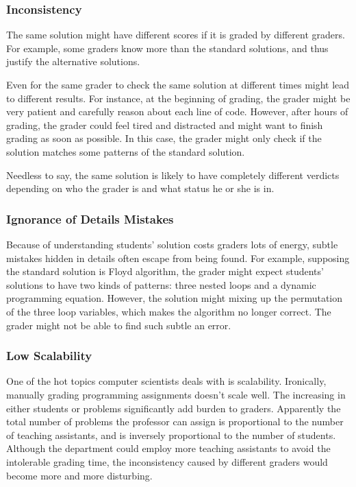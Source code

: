         \subsubsection{Inconsistency}

            The same solution might have different scores if it is graded by different graders.
            For example, some graders know more than the standard solutions,
            and thus justify the alternative solutions.

            Even for the same grader to check the same solution at different times might lead to different results.
            For instance, at the beginning of grading, the grader might be very patient
            and carefully reason about each line of code.
            However, after hours of grading, the grader could feel tired and distracted
            and might want to finish grading as soon as possible.
            In this case, the grader might only check if the solution matches some patterns of the standard solution.

            Needless to say, the same solution is likely to have completely different verdicts
            depending on who the grader is and what status he or she is in.

        \subsubsection{Ignorance of Details Mistakes}

            Because of understanding students' solution costs graders lots of energy,
            subtle mistakes hidden in details often escape from being found.
            For example, supposing the standard solution is Floyd algorithm, %
            the grader might expect students' solutions to have two kinds of patterns:
            three nested loops and a dynamic programming equation.
            However, the solution might mixing up the permutation of the three loop variables,
            which makes the algorithm no longer correct.
            The grader might not be able to find such subtle an error.

        \subsubsection{Low Scalability}

            One of the hot topics computer scientists deals with is scalability.
            Ironically, manually grading programming assignments doesn't scale well.
            The increasing in either students or problems significantly add burden to graders.
            Apparently the total number of problems the professor can assign is proportional to
            the number of teaching assistants, and is inversely proportional to the number of students.
            Although the department could employ more teaching assistants to avoid the intolerable grading time,
            the inconsistency caused by different graders would become more and more disturbing.

